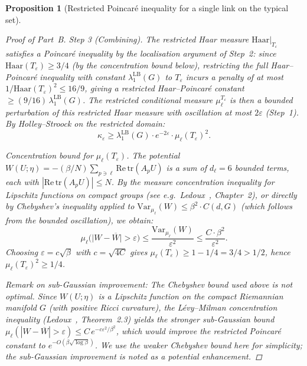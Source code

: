 \documentclass[12pt,a4paper]{article}
\theoremstyle{definition}
\theoremstyle{plain}
\newtheorem{proposition}[definition]{Proposition}
\theoremstyle{remark}
\begin{document}
\begin{proposition}[Restricted Poincar\'e inequality for a single link on the typical set]
\begin{proof}[Proof of Part~B]
\emph{Step 3 (Combining).}
The restricted Haar measure $\mathrm{Haar}|_{T_\varepsilon}$ satisfies a Poincar\'e inequality by the localisation argument of Step~2: since $\mathrm{Haar}(T_\varepsilon) \geq 3/4$ (by the concentration bound below), restricting the full Haar--Poincar\'e inequality with constant $\lambda_1^{\mathrm{LB}}(G)$ to $T_\varepsilon$ incurs a penalty of at most $1/\mathrm{Haar}(T_\varepsilon)^2 \leq 16/9$, giving a restricted Haar--Poincar\'e constant $\geq (9/16)\,\lambda_1^{\mathrm{LB}}(G)$. The restricted conditional measure $\mu_\ell^{T_\varepsilon}$ is then a bounded perturbation of this restricted Haar measure with oscillation at most $2\varepsilon$ (Step~1). By Holley--Stroock on the restricted domain:
\[
    \kappa_\varepsilon \geq \lambda_1^{\mathrm{LB}}(G) \cdot e^{-2\varepsilon} \cdot \mu_\ell(T_\varepsilon)^2.
\]

\emph{Concentration bound for $\mu_\ell(T_\varepsilon)$.}
The potential $W(U;\eta) = -(\beta/N)\sum_{p \ni \ell} \mathrm{Re}\,\mathrm{tr}(A_p U)$ is a sum of $d_\ell = 6$ bounded terms, each with $|\mathrm{Re}\,\mathrm{tr}(A_p U)| \leq N$. By the measure concentration inequality for Lipschitz functions on compact groups (see e.g.\ Ledoux~\cite{Ledoux2001}, Chapter~2), or directly by Chebyshev's inequality applied to $\mathrm{Var}_{\mu_\ell}(W) \leq \beta^2 \cdot C(d,G)$ (which follows from the bounded oscillation), we obtain:
\[
    \mu_\ell\bigl(\bigl|W - \overline{W}\bigr| > \varepsilon\bigr) \leq \frac{\mathrm{Var}_{\mu_\ell}(W)}{\varepsilon^2} \leq \frac{C \cdot \beta^2}{\varepsilon^2}.
\]
Choosing $\varepsilon = c\sqrt{\beta}$ with $c = \sqrt{4C}$ gives $\mu_\ell(T_\varepsilon) \geq 1 - 1/4 = 3/4 > 1/2$, hence $\mu_\ell(T_\varepsilon)^2 \geq 1/4$.

\emph{Remark on sub-Gaussian improvement:} The Chebyshev bound used above is not optimal. Since $W(U;\eta)$ is a Lipschitz function on the compact Riemannian manifold $G$ (with positive Ricci curvature), the L\'evy--Milman concentration inequality (Ledoux~\cite{Ledoux2001}, Theorem~2.3) yields the stronger sub-Gaussian bound $\mu_\ell(|W - \overline{W}| > \varepsilon) \leq C\,e^{-c\varepsilon^2/\beta^2}$, which would improve the restricted Poincar\'e constant to $e^{-O(\beta\sqrt{\log\beta})}$. We use the weaker Chebyshev bound here for simplicity; the sub-Gaussian improvement is noted as a potential enhancement.
\end{proof}
\end{proposition}
\end{document}
